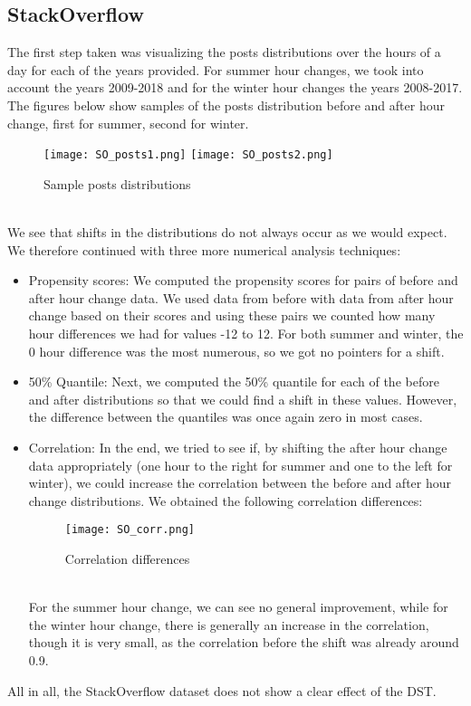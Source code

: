 \documentclass[11pt]{article}
\begin{document}
\subsection{StackOverflow}
The first step taken was visualizing the posts distributions over the hours of a day for each of the years provided. For summer hour changes, we took into account the years 2009-2018 and for the winter hour changes the years 2008-2017. The figures below show samples of the posts distribution before and after hour change, first for summer, second for winter.\\
\begin{figure}[h!]
\centering
\texttt{[image: SO\_posts1.png]}
\centering
\texttt{[image: SO\_posts2.png]}
\caption{Sample posts distributions}
\end{figure}\\
We see that shifts in the distributions do not always occur as we would expect.\\
We therefore continued with three more numerical analysis techniques: 
\begin{itemize}
    \item Propensity scores: We computed the propensity scores for pairs of before and after hour change data. We used data from before with data from after hour change based on their scores and using these pairs we counted how many hour differences we had for values -12 to 12. For both summer and winter, the 0 hour difference was the most numerous, so we got no pointers for a shift.
    \item 50\% Quantile: Next, we computed the 50\% quantile for each of the before and after distributions so that we could find a shift in these values. However, the difference between the quantiles was once again zero in most cases.
    \item Correlation: In the end, we tried to see if, by shifting the after hour change data appropriately (one hour to the right for summer and one to the left for winter), we could increase the correlation between the before and after hour change distributions. We obtained the following correlation differences:
    \begin{figure}[h!]
    \centering
    \texttt{[image: SO\_corr.png]}
    \caption{Correlation differences}
    \end{figure}\\
    For the summer hour change, we can see no general improvement, while for the winter hour change, there is generally an increase in the correlation, though it is very small, as the correlation before the shift was already around 0.9.
\end{itemize}
All in all, the StackOverflow dataset does not show a clear effect of the DST.
\end{document}
